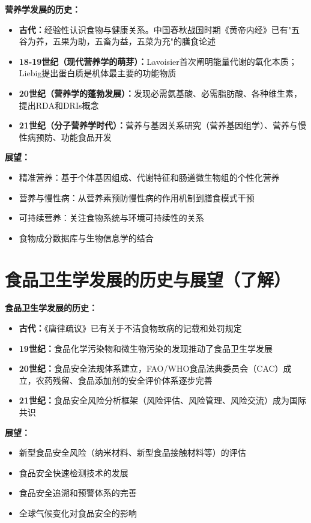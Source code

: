 \begin{tipbox}
\textbf{营养学发展的历史：}
\begin{itemize}[leftmargin=*]
    \item \textbf{古代：}经验性认识食物与健康关系。中国春秋战国时期《黄帝内经》已有"五谷为养，五果为助，五畜为益，五菜为充"的膳食论述
    \item \textbf{18-19世纪（现代营养学的萌芽）：}Lavoisier首次阐明能量代谢的氧化本质；Liebig提出蛋白质是机体最主要的功能物质
    \item \textbf{20世纪（营养学的蓬勃发展）：}发现必需氨基酸、必需脂肪酸、各种维生素，提出RDA和DRIs概念
    \item \textbf{21世纪（分子营养学时代）：}营养与基因关系研究（营养基因组学）、营养与慢性病预防、功能食品开发
\end{itemize}

\textbf{展望：}
\begin{itemize}[leftmargin=*]
    \item 精准营养：基于个体基因组成、代谢特征和肠道微生物组的个性化营养
    \item 营养与慢性病：从营养素预防慢性病的作用机制到膳食模式干预
    \item 可持续营养：关注食物系统与环境可持续性的关系
    \item 食物成分数据库与生物信息学的结合
\end{itemize}
\end{tipbox}

\section{食品卫生学发展的历史与展望（了解）}

\begin{tipbox}
\textbf{食品卫生学发展的历史：}
\begin{itemize}[leftmargin=*]
    \item \textbf{古代：}《唐律疏议》已有关于不洁食物致病的记载和处罚规定
    \item \textbf{19世纪：}食品化学污染物和微生物污染的发现推动了食品卫生学发展
    \item \textbf{20世纪：}食品安全法规体系建立，FAO/WHO食品法典委员会（CAC）成立，农药残留、食品添加剂的安全评价体系逐步完善
    \item \textbf{21世纪：}食品安全风险分析框架（风险评估、风险管理、风险交流）成为国际共识
\end{itemize}

\textbf{展望：}
\begin{itemize}[leftmargin=*]
    \item 新型食品安全风险（纳米材料、新型食品接触材料等）的评估
    \item 食品安全快速检测技术的发展
    \item 食品安全追溯和预警体系的完善
    \item 全球气候变化对食品安全的影响
\end{itemize}
\end{tipbox}

